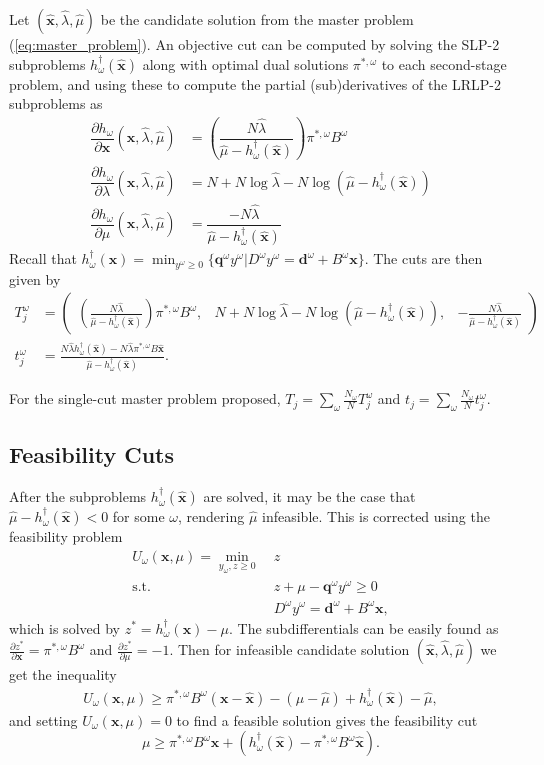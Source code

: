 \documentclass{iserc}
\newcommand{\x}{\mathbf{x}}
\newcommand{\xh}{\hat{\x}}
\newcommand{\lh}{\hat{\lambda}}
\newcommand{\mh}{\hat{\mu}}
\newcommand{\q}{\mathbf{q}}
\renewcommand{\d}{\mathbf{d}}
\newcommand{\st}{\mbox{s.t.}}
\begin{document}
Let $(\xh,\lh,\mh)$ be the candidate solution from the master problem (\ref{eq:master_problem}).
An objective cut can be computed by solving the SLP-2 subproblems $h^\dagger_\omega(\xh)$ along with optimal dual solutions $\pi^{*,\omega}$ to each second-stage problem, and using these to compute the partial (sub)derivatives of the LRLP-2 subproblems as
\begin{align*}
	\dfrac{\partial h_\omega}{\partial \x}(\xh,\lh,\mh) & = \left(\dfrac{N\lh}{\mh - h^\dagger_\omega(\xh)}\right) \pi^{*,\omega} B^\omega \\
	\dfrac{\partial h_\omega}{\partial \lambda}(\xh,\lh,\mh) & = N + N\log\lh - N \log(\mh - h^\dagger_\omega(\xh)) \\
	\dfrac{\partial h_\omega}{\partial \mu}(\xh,\lh,\mh) & = \dfrac{-N\lh}{\mh - h^\dagger_\omega(\xh)}
\end{align*}
Recall that $h^\dagger_\omega(\x) = \min_{y^\omega \geq 0} \{\q^\omega y^\omega | D^\omega y^\omega = \d^\omega + B^\omega \x\}$.
The cuts are then given by
\begin{align*}
	T_j^\omega & = 
	\left( \begin{array}{ccc}
		\left(\frac{N\lh}{\mh - h^\dagger_\omega(\xh)}\right) \pi^{*,\omega} B^\omega, 
			 & N + N\log\lh - N\log(\mh - h^\dagger_\omega(\xh)), 
			 & -\frac{N\lh}{\mh - h^\dagger_\omega(\xh)}
	\end{array} \right) \\
	t_j^\omega & = \frac{N \lh h^\dagger_\omega(\xh) - N \lh \pi^{*,\omega}B\xh}{\mh - h^\dagger_\omega(\xh)}.
\end{align*}

For the single-cut master problem proposed, $T_j = \sum_\omega \frac{N_\omega}{N} T_j^\omega$ and $t_j = \sum_\omega \frac{N_\omega}{N} t_j^\omega$.

\subsection{Feasibility Cuts}
After the subproblems $h^\dagger_\omega(\xh)$ are solved, it may be the case that $\mh - h^\dagger_\omega(\xh) < 0$ for some $\omega$, rendering $\mh$ infeasible.
This is corrected using the feasibility problem
\begin{align*}
	U_\omega(\x,\mu) = \min_{y_\omega,z \geq 0} \ & z \\
	\st \ & z + \mu - \q^\omega y^\omega \geq 0 \\
	& D^\omega y^\omega = \d^\omega + B^\omega \x,
\end{align*}
which is solved by $z^* = h^\dagger_\omega(\x) - \mu$.
The subdifferentials can be easily found as $\frac{\partial z^*}{\partial \x} = \pi^{*,\omega} B^\omega$ and $\frac{\partial z^*}{\partial \mu} = -1$.
Then for infeasible candidate solution $(\xh,\lh,\mh)$ we get the inequality
\begin{align*}
	U_\omega(\x,\mu) \geq \pi^{*,\omega}B^\omega(\x-\xh) - (\mu -\mh) + h^\dagger_\omega(\xh) - \mh,
\end{align*}
and setting $U_\omega(\x,\mu) = 0$ to find a feasible solution gives the feasibility cut
\[
	\mu \geq \pi^{*,\omega}B^\omega \x + (h^\dagger_\omega(\xh) - \pi^{*,\omega}B^\omega\xh).
\]
\end{document}
